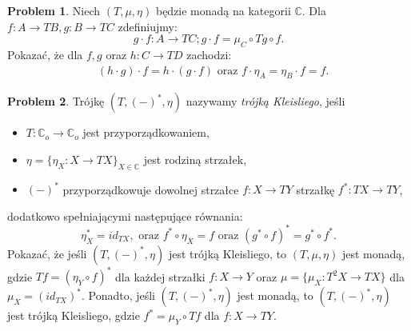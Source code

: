 \documentclass[10pt]{amsart}
\theoremstyle{plain}
\theoremstyle{definition}
\newtheorem{problem}{Problem}
\numberwithin{equation}{section}
\begin{document}
\begin{problem}
  Niech $(T,\mu,\eta)$ będzie monadą na kategorii $\mathbb{C}$. Dla $f:A\to TB, g:B\to TC$ zdefiniujmy:
  $$ g \cdot f :A\to TC; g\cdot f = \mu_C \circ Tg \circ f .$$ 
  Pokazać, że dla $f,g$ oraz $h:C\to TD$ zachodzi:
  \begin{align*}
    & (h\cdot g)\cdot f = h\cdot (g\cdot f) \text{ oraz } f\cdot \eta_A = \eta_B\cdot f = f.  
  \end{align*}
\end{problem}

\begin{problem}
 Trójkę $(T,(-)^\ast, \eta)$ nazywamy \emph{trójką Kleisliego}, jeśli
 \begin{itemize}
   \item $T:\mathbb{C}_o\to \mathbb{C}_o$ jest przyporządkowaniem,
   \item $\eta= \{\eta_X:X\to TX\}_{X\in \mathbb{C}}$ jest rodziną strzałek,
   \item $(-)^\ast$ przyporządkowuje dowolnej strzałce $f:X\to TY$ strzałkę $f^\ast :TX\to TY$, 
  \end{itemize}
 dodatkowo spełniającymi następujące równania:
 \[ 
   \eta_X^\ast = id_{TX}, \text{ oraz } f^\ast \circ \eta_X = f \text{ oraz } 
    (g^\ast \circ f)^\ast = g^\ast \circ f^\ast.
 \]
 Pokazać, że jeśli $(T, (-)^\ast, \eta)$ jest trójką Kleisliego, to $(T,\mu,\eta)$ jest monadą, gdzie $Tf = (\eta_Y\circ f)^\ast$ 
 dla każdej strzałki $f:X\to Y$ oraz
 $\mu = \{\mu_X:T^2X\to TX\}$ dla $\mu_X = (id_{TX})^\ast$. 
 Ponadto, jeśli $(T,(-)^\ast, \eta)$ jest monadą, 
 to $(T,(-)^\ast, \eta)$ jest trójką Kleisliego, gdzie $f^\ast = \mu_Y \circ Tf$ dla $f:X\to TY$. 
\end{problem} 
\end{document}

